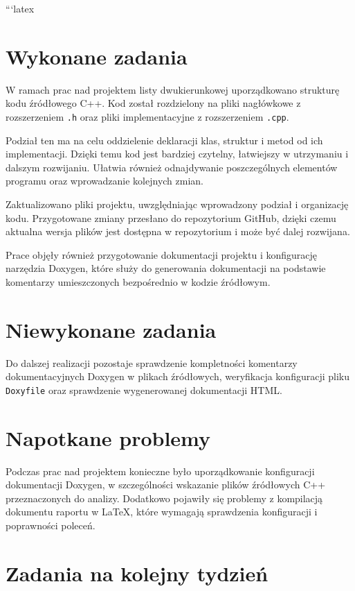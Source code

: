 ```latex
\section{Wykonane zadania}

W ramach prac nad projektem listy dwukierunkowej uporządkowano
strukturę kodu źródłowego C++. Kod został rozdzielony na pliki
nagłówkowe z rozszerzeniem \texttt{.h} oraz pliki
implementacyjne z rozszerzeniem \texttt{.cpp}.

Podział ten ma na celu oddzielenie deklaracji klas, struktur
i metod od ich implementacji. Dzięki temu kod jest bardziej
czytelny, łatwiejszy w utrzymaniu i dalszym rozwijaniu.
Ułatwia również odnajdywanie poszczególnych elementów programu
oraz wprowadzanie kolejnych zmian.

Zaktualizowano pliki projektu, uwzględniając wprowadzony podział
i organizację kodu. Przygotowane zmiany przesłano do repozytorium
GitHub, dzięki czemu aktualna wersja plików jest dostępna
w repozytorium i może być dalej rozwijana.

Prace objęły również przygotowanie dokumentacji projektu
i konfigurację narzędzia Doxygen, które służy do generowania
dokumentacji na podstawie komentarzy umieszczonych bezpośrednio
w kodzie źródłowym.

\section{Niewykonane zadania}

Do dalszej realizacji pozostaje sprawdzenie kompletności
komentarzy dokumentacyjnych Doxygen w plikach źródłowych,
weryfikacja konfiguracji pliku \texttt{Doxyfile} oraz
sprawdzenie wygenerowanej dokumentacji HTML.

\section{Napotkane problemy}

Podczas prac nad projektem konieczne było uporządkowanie
konfiguracji dokumentacji Doxygen, w szczególności wskazanie
plików źródłowych C++ przeznaczonych do analizy.
Dodatkowo pojawiły się problemy z kompilacją dokumentu
raportu w LaTeX, które wymagają sprawdzenia konfiguracji
i poprawności poleceń.

\section{Zadania na kolejny tydzień}

